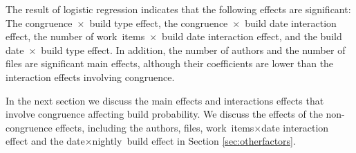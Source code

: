 
The result of logistic regression indicates that the following effects are significant: The congruence~$\times$~build type effect, the congruence~$\times$~build date interaction effect, the number of work~items~$\times$~build date interaction effect, and the build date~$\times$~build type effect. In addition, the number of authors and the number of files are significant main effects, although their coefficients are lower than the interaction effects involving congruence.

In the next section we discuss the main effects and interactions effects that involve congruence affecting build probability. We discuss the effects of the non-congruence effects, including the authors, files, work~items$\times$date interaction effect and the date$\times$nightly~build effect in Section \ref{sec:otherfactors}.

